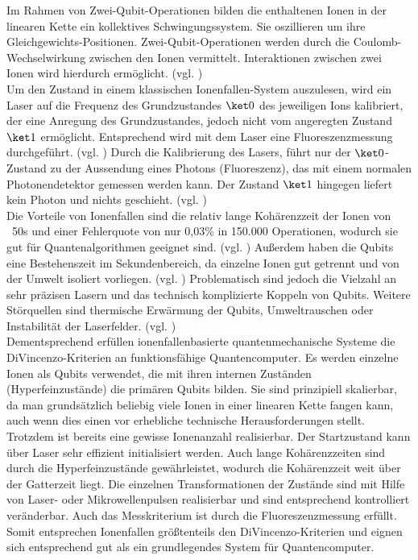 Im Rahmen von Zwei-Qubit-Operationen bilden die enthaltenen Ionen in der linearen Kette ein kollektives Schwingungssystem. Sie oszillieren um ihre Gleichgewichts-Positionen. Zwei-Qubit-Operationen werden durch die Coulomb-Wechselwirkung zwischen den Ionen vermittelt. Interaktionen zwischen zwei Ionen wird hierdurch ermöglicht. (vgl. \cite[Ch. 21.1]{lapierre_introduction_2021}) %
\\

Um den Zustand in einem klassischen Ionenfallen-System auszulesen, wird ein Laser auf die Frequenz des Grundzustandes $\ket0$ des jeweiligen Ions kalibriert, der eine Anregung des Grundzustandes, jedoch nicht vom angeregten Zustand $\ket1$ ermöglicht. Entsprechend wird mit dem Laser eine Fluoreszenzmessung durchgeführt. (vgl. \cite[Ch 21.1]{lapierre_introduction_2021})
Durch die Kalibrierung des Lasers, führt nur der $\ket0$-Zustand zu der Aussendung eines Photons (Fluoreszenz), das mit einem normalen Photonendetektor gemessen werden kann. Der Zustand $\ket1$ hingegen liefert kein Photon und nichts geschieht. (vgl. \cite[Ch 21.1]{lapierre_introduction_2021}) %
\\

Die Vorteile von Ionenfallen sind die relativ lange Kohärenzzeit der Ionen von ~50s und einer Fehlerquote von nur 0,03\% in 150.000 Operationen, wodurch sie gut für Quantenalgorithmen geeignet sind. (vgl. \cite[Ch. 4.6.1]{kasirajan_fundamentals_2021})
Außerdem haben die Qubits eine Bestehenszeit im Sekundenbereich, da einzelne Ionen gut getrennt und von der Umwelt isoliert vorliegen. (vgl. \cite[Ch 21.1]{lapierre_introduction_2021})
Problematisch sind jedoch die Vielzahl an sehr präzisen Lasern und das technisch komplizierte Koppeln von Qubits. Weitere Störquellen sind thermische Erwärmung der Qubits, Umweltrauschen oder Instabilität der Laserfelder. (vgl. \cite[Ch. 4.6.1]{kasirajan_fundamentals_2021}) 
\\

Dementsprechend erfüllen ionenfallenbasierte quantenmechanische Systeme die DiVincenzo-Kriterien an funktionsfähige Quantencomputer.
Es werden einzelne Ionen als Qubits verwendet, die mit ihren internen Zuständen (Hyperfeinzustände) die primären Qubits bilden. Sie sind prinzipiell skalierbar, da man grundsätzlich beliebig viele Ionen in einer linearen Kette fangen kann, auch wenn dies einen vor erhebliche technische Herausforderungen stellt. Trotzdem ist bereits eine gewisse Ionenanzahl realisierbar.
Der Startzustand kann über Laser sehr effizient initialisiert werden. Auch lange Kohärenzzeiten sind durch die Hyperfeinzustände gewährleistet, wodurch die Kohärenzzeit weit über der Gatterzeit liegt.
Die einzelnen Transformationen der Zustände sind mit Hilfe von Laser- oder Mikrowellenpulsen realisierbar und sind entsprechend kontrolliert veränderbar.
Auch das Messkriterium ist durch die Fluoreszenzmessung erfüllt. Somit entsprechen Ionenfallen größtenteils den DiVincenzo-Kriterien und eignen sich entsprechend gut als ein grundlegendes System für Quantencomputer. 

